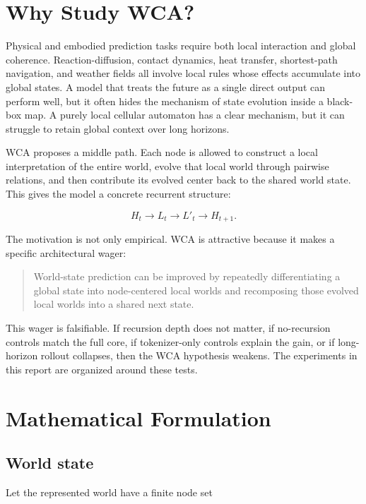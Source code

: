 \documentclass[11pt]{article}
\begin{document}
\section{Why Study WCA?}

Physical and embodied prediction tasks require both local interaction and
global coherence. Reaction-diffusion, contact dynamics, heat transfer,
shortest-path navigation, and weather fields all involve local rules whose
effects accumulate into global states. A model that treats the future as a
single direct output can perform well, but it often hides the mechanism of state
evolution inside a black-box map. A purely local cellular automaton has a clear
mechanism, but it can struggle to retain global context over long horizons.

WCA proposes a middle path. Each node is allowed to construct a local
interpretation of the entire world, evolve that local world through pairwise
relations, and then contribute its evolved center back to the shared world
state. This gives the model a concrete recurrent structure:

\[
H_t \longrightarrow L_t \longrightarrow L'_t \longrightarrow H_{t+1}.
\]

The motivation is not only empirical. WCA is attractive because it makes a
specific architectural wager:

\begin{quote}
World-state prediction can be improved by repeatedly differentiating a global
state into node-centered local worlds and recomposing those evolved local
worlds into a shared next state.
\end{quote}

This wager is falsifiable. If recursion depth does not matter, if no-recursion
controls match the full core, if tokenizer-only controls explain the gain, or
if long-horizon rollout collapses, then the WCA hypothesis weakens. The
experiments in this report are organized around these tests.

\section{Mathematical Formulation}

\subsection{World state}

Let the represented world have a finite node set
\end{document}
